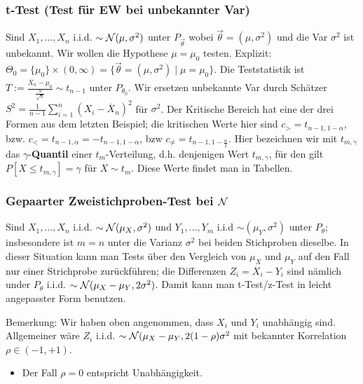 \subsubsection{t-Test (Test für EW bei unbekannter Var)}
Sind $X_1, \dots, X_n$ i.i.d. $\sim \mathcal{N}(\mu, \sigma^2)$ unter $P_{\overrightarrow{\theta}}$ wobei $\overrightarrow{\theta} = (\mu, \sigma^2)$ und die Var $\sigma^2$ ist unbekannt. Wir wollen die Hypothese $\mu = \mu_0$ testen. Explizit: $\Theta_0 = \{\mu_0\} \times (0, \infty) = \{\overrightarrow{\theta} = (\mu, \sigma^2) \mid \mu = \mu_0\}$. Die Teststatistik ist $T := \frac{\overline{X}_n - \mu_0}{\frac{S}{\sqrt{n}}} \sim t_{n - 1}$ unter $P_{\theta_0}$. Wir ersetzen unbekannte Var durch Schätzer $S^2 = \frac{1}{n - 1} \sum_{i=1}^{n} (X_i - \overline{X}_n)^2$ für $\sigma^2$.
Der Kritische Bereich hat eine der drei Formen aus dem letzten Beispiel; die kritischen Werte hier sind $c_> = t_{n - 1, 1 - \alpha}$, bzw. $c_< = t_{n - 1, \alpha} = -t_{n - 1, 1 - \alpha}$, bzw $c_{\neq} = t_{n - 1, 1 - \frac{\alpha}{2}}$. Hier bezeichnen wir mit $t_{m, \gamma}$ das $\gamma$-\textbf{Quantil} einer $t_m$-Verteilung, d.h. denjenigen Wert $t_{m, \gamma}$, für den gilt $P[X \le t_{m, \gamma}] = \gamma$ für $X \sim t_m$. Diese Werte findet man in Tabellen.

\subsubsection{Gepaarter Zweistichproben-Test bei $\mathcal{N}$}
Sind $X_1, \dots, X_n$ i.i.d. $\sim \mathcal{N}(\mu_X, \sigma^2)$ und $Y_1, \dots, Y_m$ i.i.d $\sim(\mu_Y, \sigma^2)$ unter $P_\theta$; insbesondere ist $m = n$ unter die Varianz $\sigma^2$ bei beiden Stichproben dieselbe. In dieser Situation kann man Tests über den Vergleich von $\mu_X$ und $\mu_Y$ auf den Fall nur einer Strichprobe zurückführen; die Differenzen $Z_i = X_i - Y_i$ sind nämlich under $P_\theta$ i.i.d. $\sim \mathcal{N}(\mu_X - \mu_Y, 2 \sigma^2)$. Damit kann man t-Test/z-Test in leicht angepasster Form benutzen.

Bemerkung: Wir haben oben angenommen, dass $X_i$ und $Y_i$ unabhängig sind. Allgemeiner wäre $Z_i$ i.i.d. $\sim \mathcal{N}(\mu_X - \mu_Y, 2 (1 - \rho)\sigma^2$ mit bekannter Korrelation $\rho \in (-1, +1)$.
    \begin{itemize}
        \item Der Fall $\rho = 0$ entspricht Unabhängigkeit.
    \end{itemize}

